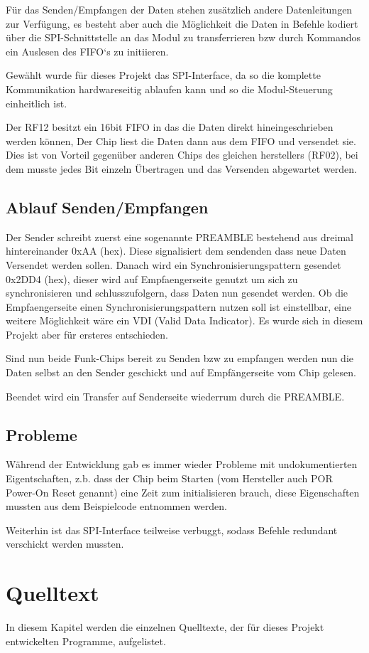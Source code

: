 \documentclass{scrartcl}
\begin{document}
		Für das Senden/Empfangen der Daten stehen zusätzlich andere Datenleitungen
		zur Verfügung, es besteht aber auch die Möglichkeit die Daten in Befehle
		kodiert über die SPI-Schnittstelle an das Modul zu transferrieren bzw
		durch Kommandos ein Auslesen des FIFO`s zu initiieren.

		Gewählt wurde für dieses Projekt das SPI-Interface, da so die komplette 
		Kommunikation hardwareseitig ablaufen kann und so die Modul-Steuerung einheitlich ist.

		Der RF12 besitzt ein 16bit FIFO in das die Daten direkt hineingeschrieben werden können,
		Der Chip liest die Daten dann aus dem FIFO und versendet sie.
		Dies ist von Vorteil gegenüber anderen Chips des gleichen herstellers (RF02), bei dem
		musste jedes Bit einzeln Übertragen und das Versenden abgewartet werden.

	\subsection{Ablauf Senden/Empfangen}
		Der Sender schreibt zuerst eine sogenannte PREAMBLE bestehend aus dreimal 
		hintereinander 0xAA (hex). Diese signalisiert dem sendenden dass neue Daten 
		Versendet werden sollen.
		Danach wird ein Synchronisierungspattern gesendet 0x2DD4 (hex), dieser wird
		auf Empfaengerseite genutzt um sich zu synchronisieren und schlusszufolgern,
		dass Daten nun gesendet werden. Ob die Empfaengerseite einen
		Synchronisierungspattern nutzen soll ist einstellbar, eine weitere Möglichkeit
		wäre ein VDI (Valid Data Indicator). Es wurde sich in diesem Projekt
		aber für ersteres entschieden.

		Sind nun beide Funk-Chips bereit zu Senden bzw zu empfangen werden nun die Daten
		selbst an den Sender geschickt und auf Empfängerseite vom Chip gelesen.

		Beendet wird ein Transfer auf Senderseite wiederrum durch die PREAMBLE.

	\subsection{Probleme}
		Während der Entwicklung gab es immer wieder Probleme mit undokumentierten Eigentschaften,
		z.b. dass der Chip beim Starten (vom Hersteller auch POR Power-On Reset genannt)
		eine Zeit zum initialisieren brauch, diese Eigenschaften mussten aus dem Beispielcode 
		entnommen werden.
		
		Weiterhin ist das SPI-Interface teilweise verbuggt, sodass Befehle redundant verschickt 
		werden mussten.
		

\newpage

\section{Quelltext} %
	In diesem Kapitel werden die einzelnen Quelltexte, der für dieses Projekt entwickelten Programme, aufgelistet.


\end{document}

